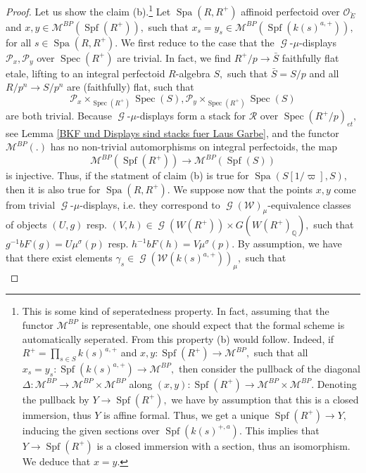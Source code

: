 \documentclass[a4paper,10,5 pt]{amsart}
\theoremstyle{definition}
\DeclareMathOperator{\Spec}{Spec}
\DeclareMathOperator{\Spa}{Spa}
\DeclareMathOperator{\Spf}{Spf}
\DeclareMathOperator{\G}{\mathcal{G}}
\begin{document}
\begin{proof}
Let us show the claim (b).\footnote{This is some kind of seperatedness property. In fact, assuming that the functor $\mathcal{M}^{BP}$ is representable, one should expect that the formal scheme is automatically seperated. From this property (b) would follow. Indeed, if $R^{+}=\prod_{s\in S} k(s)^{a,+}$ and $x,y\colon \Spf(R^{+})\rightarrow \mathcal{M}^{BP},$ such that all $x_{s}=y_{s}\colon \Spf(k(s)^{a,+})\rightarrow \mathcal{M}^{BP},$ then consider the pullback of the diagonal $\Delta\colon \mathcal{M}^{BP}\rightarrow \mathcal{M}^{BP} \times \mathcal{M}^{BP}$ along $(x,y)\colon \Spf(R^{+})\rightarrow \mathcal{M}^{BP}\times \mathcal{M}^{BP}.$ Denoting the pullback by $Y\rightarrow \Spf(R^{+}),$ we have by assumption that this is a closed immersion, thus $Y$ is affine formal. Thus, we get a unique $\Spf(R^{+})\rightarrow Y,$ inducing the given sections over $\Spf(k(s)^{+,a}).$ This implies that $Y\rightarrow \Spf(R^{+})$ is a closed immersion with a section, thus an isomorphism. We deduce that $x=y.$} Let  $\Spa(R,R^{+})$ affinoid perfectoid over $\mathcal{O}_{\breve{E}}$ and $x,y\in\mathcal{M}^{BP}(\Spf(R^{+})),$ such that $x_{s}=y_{s}\in \mathcal{M}^{BP}(\Spf(k(s)^{a,+})),$ for all $s\in \Spa(R,R^{+}).$ We first reduce to the case that the $\G$-$\mu$-displays $\mathcal{P}_{x}, \mathcal{P}_{y}$ over $\Spec(R^{+})$ are trivial. In fact, we find $R^{+}/p\rightarrow \bar{S}$ faithfully flat etale, lifting to an integral perfectoid $R$-algebra $S,$ such that $\bar{S}=S/p$ and all $R/p^{n}\rightarrow S/p^{n}$ are (faithfully) flat, such that
$$
\mathcal{P}_{x}\times_{\Spec(R^{+})} \Spec(S),\mathcal{P}_{y}\times_{\Spec(R^{+})} \Spec(S) 
$$ 
are both trivial. Because $\G$-$\mu$-displays form a stack for $\mathcal{R}$ over $\Spec(R^{+}/p)_{et},$ see Lemma \ref{BKF und Displays sind stacks fuer Laus Garbe}, and the functor $\mathcal{M}^{BP}(.)$ has no non-trivial automorphisms on integral perfectoids, the map
$$
\mathcal{M}^{BP}(\Spf(R^{+}))\rightarrow \mathcal{M}^{BP}(\Spf(S))
$$
is injective. Thus, if the statment of claim (b) is true for $\Spa(S[1/\varpi],S),$ then it is also true for $\Spa(R,R^{+}).$ We suppose now that the points $x,y$ come from trivial $\G$-$\mu$-displays, i.e. they correspond to $\G(\mathcal{W})_{\mu}$-equivalence classes of objects $(U,g)$ resp. $(V,h)\in \G(W(R^{+}))\times G(W(R^{+})_{\mathbb{Q}}),$ such that $g^{-1}bF(g)=U\mu^{\sigma}(p)$ resp. $h^{-1}bF(h)=V\mu^{\sigma}(p).$ By assumption, we have that there exist elements $\gamma_{s}\in \G(\mathcal{W}(k(s)^{a,+}))_{\mu},$ such that
\begin{equation}

\end{equation}
\end{proof}
\end{document}
